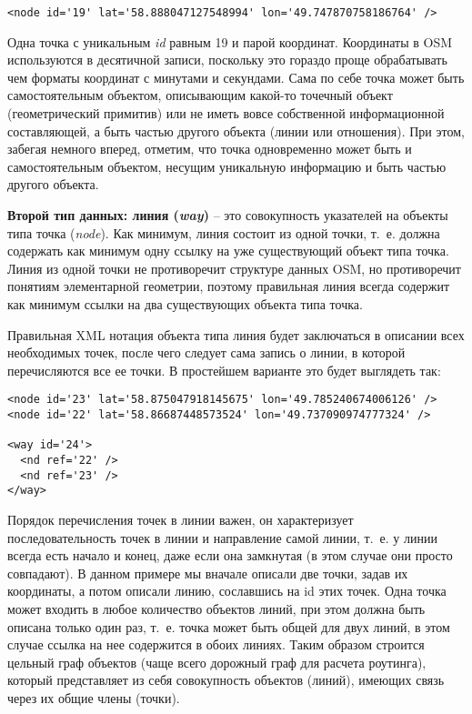 \small
\begin{verbatim}
<node id='19' lat='58.888047127548994' lon='49.747870758186764' />
\end{verbatim}
\normalsize

Одна точка с уникальным \emph{id} равным 19 и парой координат. Координаты в 
OSM используются в десятичной записи, поскольку это гораздо проще обрабатывать 
чем форматы координат с минутами и секундами. Сама по себе точка может быть 
самостоятельным объектом, описывающим какой-то точечный объект (геометрический 
примитив) или не иметь вовсе собственной информационной составляющей, а быть 
частью другого объекта (линии или отношения). При этом, забегая немного 
вперед, отметим, что точка одновременно может быть и самостоятельным объектом, 
несущим уникальную информацию и быть частью другого объекта.

\textbf{Второй тип данных: линия (\emph{way})} -- это совокупность указателей 
на объекты типа точка (\emph{node}). Как минимум, линия состоит из одной 
точки, т.~е. должна содержать как минимум одну ссылку на уже существующий 
объект типа точка. Линия из одной точки не противоречит структуре данных OSM, 
но противоречит понятиям элементарной геометрии, поэтому правильная линия
всегда содержит как минимум ссылки на два существующих объекта типа точка.

Правильная XML нотация объекта типа линия будет заключаться в описании всех 
необходимых точек, после чего следует сама запись о линии, в которой 
перечисляются все ее точки. В простейшем варианте это будет выглядеть так:

\small
\begin{verbatim}
<node id='23' lat='58.875047918145675' lon='49.785240674006126' />
<node id='22' lat='58.86687448573524' lon='49.737090974777324' />

<way id='24'>
  <nd ref='22' />
  <nd ref='23' />
</way>
\end{verbatim}
\normalsize

Порядок перечисления точек в линии важен, он характеризует последовательность 
точек в линии и направление самой линии, т.~е. у линии всегда есть начало и 
конец, даже если она замкнутая (в этом случае они просто совпадают). В данном 
примере мы вначале описали две точки, задав их координаты, а потом описали 
линию, сославшись на id этих точек. Одна точка может входить в любое количество 
объектов линий, при этом должна быть описана только один раз, т.~е. точка может 
быть общей для двух линий, в этом случае ссылка на нее содержится в обоих 
линиях. Таким образом строится цельный граф объектов (чаще всего дорожный граф 
для расчета роутинга), который представляет из себя совокупность объектов 
(линий), имеющих связь через их общие члены (точки).

